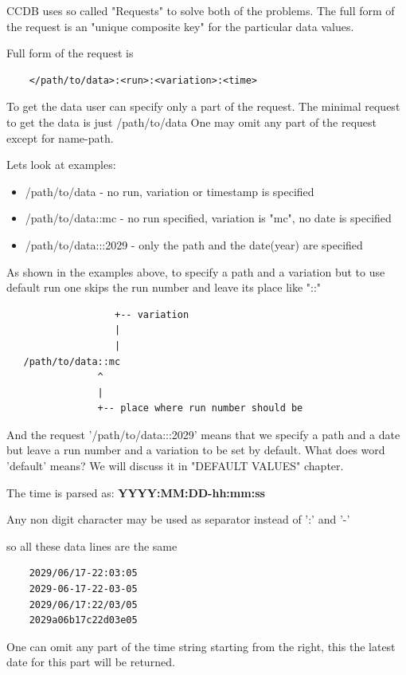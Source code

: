 \documentclass{article}
\begin{document}
CCDB uses so called "Requests" to solve both of the problems.
The full form of the request is an "unique composite key" for
the particular data values.

Full form of the request is
\begin{verbatim}
    </path/to/data>:<run>:<variation>:<time>
\end{verbatim}
\vspace{1 em}

To get the data user can specify only a part of the request.
The minimal request to get the data is just /path/to/data
One may omit any part of the request except for name-path.

Lets look at examples:
\begin{itemize}
\item /path/to/data - no run, variation or timestamp is specified
\item /path/to/data::mc - no run specified, variation is "mc", no date is specified
\item /path/to/data:::2029 - only the path and the date(year) are specified
\end{itemize}

As shown in the examples above, to specify a path and a variation but 
to use default run one skips the run number and leave its place like "::"
\begin{verbatim}
                   +-- variation
                   |
                   |
   /path/to/data::mc
                ^
                |
                +-- place where run number should be
\end{verbatim}


And the request '/path/to/data:::2029' means that we specify a path and a date
but leave a run number and a variation to be set by default.
What does word 'default' means? We will discuss it in "DEFAULT VALUES" chapter.

The time is parsed as:
    \textbf{YYYY:MM:DD-hh:mm:ss}

Any non digit character may be used as separator instead of ':' and '-'

so all these data lines are the same
\begin{verbatim}
    2029/06/17-22:03:05
    2029-06-17-22-03-05
    2029/06/17:22/03/05
    2029a06b17c22d03e05
\end{verbatim}

One can omit any part of the time string starting from the right, this the latest 
date for this part will be returned.
\end{document}
